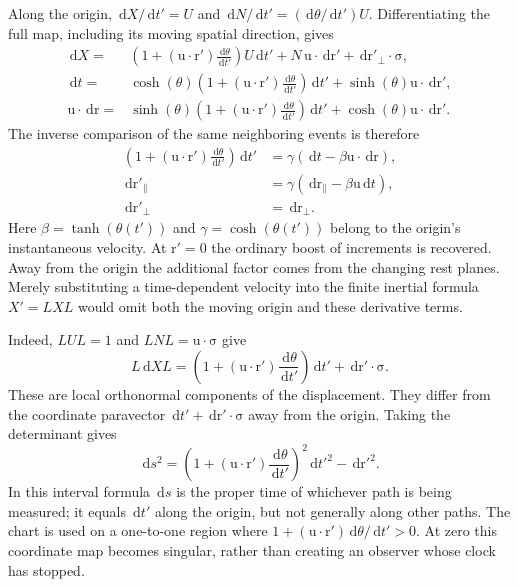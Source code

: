 \documentclass[11pt]{article}
\newcommand{\pv}[1]{{#1}}
\newcommand{\vstyle}[1]{{\bm{\mathrm{#1}}}}
\newcommand{\pL}{\pv{L}}
\newcommand{\pN}{\pv{N}}
\newcommand{\pU}{\pv{U}}
\newcommand{\pX}{\pv{X}}
\numberwithin{equation}{section}
\newcommand{\dotprod}{\cdot}
\newcommand{\bsig}{\vstyle{\sigma}}
\newcommand{\br}{\vstyle{r}}
\newcommand{\bu}{\vstyle{u}}
\newcommand{\dd}{\,\mathrm d}
\begin{document}
Along the origin, $\dd\pX/\dd t'=\pU$ and
$\dd\pN/\dd t'=(\dd\theta/\dd t')\pU$. Differentiating the full map,
including its moving spatial direction, gives
\begin{align*}
 \dd\pX={}&\left(1+(\bu\dotprod\br')\frac{\dd\theta}{\dd t'}\right)
 \pU\dd t'
 +\pN\,\bu\dotprod\dd\br'
 +\dd\br'_{\perp}\dotprod\bsig,\\
 \dd t={}&\cosh(\theta)
 \left(1+(\bu\dotprod\br')\frac{\dd\theta}{\dd t'}\right)\dd t'
 +\sinh(\theta)\bu\dotprod\dd\br',\\
 \bu\dotprod\dd\br={}&\sinh(\theta)
 \left(1+(\bu\dotprod\br')\frac{\dd\theta}{\dd t'}\right)\dd t'
 +\cosh(\theta)\bu\dotprod\dd\br'.
\end{align*}
The inverse comparison of the same neighboring events is therefore
\begin{equation}
 \boxed{\begin{aligned}
 \left(1+(\bu\dotprod\br')\frac{\dd\theta}{\dd t'}\right)\dd t'
 &=\gamma(\dd t-\beta\bu\dotprod\dd\br),\\
 \dd\br'_{\parallel}&=\gamma(\dd\br_{\parallel}-\beta\bu\dd t),\\
 \dd\br'_{\perp}&=\dd\br_{\perp}.
 \end{aligned}}
 \label{eq:accelerated-event-increments}
\end{equation}
Here $\beta=\tanh(\theta(t'))$ and $\gamma=\cosh(\theta(t'))$ belong
to the origin's instantaneous velocity. At $\br'=0$ the ordinary boost
of increments is recovered. Away from the origin the additional factor
comes from the changing rest planes. Merely substituting a time-dependent
velocity into the finite inertial formula $\pX'=\pL\pX\pL$ would omit
both the moving origin and these derivative terms.

Indeed, $\pL\pU\pL=1$ and $\pL\pN\pL=\bu\dotprod\bsig$ give
\[
 \pL\dd\pX\pL
 =\left(1+(\bu\dotprod\br')\frac{\dd\theta}{\dd t'}\right)\dd t'
 +\dd\br'\dotprod\bsig.
\]
These are local orthonormal components of the displacement. They differ
from the coordinate paravector $\dd t'+\dd\br'\dotprod\bsig$ away from
the origin. Taking the determinant gives
\begin{equation}
 \boxed{\dd s^2
 =\left(1+(\bu\dotprod\br')\frac{\dd\theta}{\dd t'}\right)^2\dd t'^2
 -\dd\br'^2.}
 \label{eq:accelerated-interval}
\end{equation}
In this interval formula $\dd s$ is the proper time of whichever path
is being measured; it equals $\dd t'$ along the origin, but not generally
along other paths.
The chart is used on a one-to-one region where
$1+(\bu\dotprod\br')\dd\theta/\dd t'>0$.
At zero this coordinate map becomes singular, rather than creating an
observer whose clock has stopped.
\end{document}
